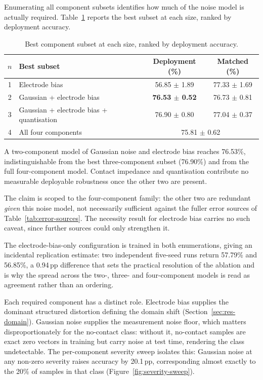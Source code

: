 Enumerating all component subsets identifies how much of the noise model is actually required. Table~\ref{tab:ablation-subset} reports the best subset at each size, ranked by deployment accuracy.

\begin{table}[htbp]
\centering
\caption[Best component subset at each size]{Best component subset at each size, ranked by deployment accuracy.}
\label{tab:ablation-subset}
\small
\setlength{\tabcolsep}{8pt}
\renewcommand{\arraystretch}{1.15}
\begin{tabular}{@{}clcc@{}}
\toprule
\textbf{$n$} & \textbf{Best subset} & \textbf{Deployment (\%)} & \textbf{Matched (\%)} \\
\midrule
1 & Electrode bias                                & 56.85 $\pm$ 1.89 & 77.33 $\pm$ 1.69 \\
2 & Gaussian + electrode bias                     & \textbf{76.53 $\pm$ 0.52} & 76.73 $\pm$ 0.81 \\
3 & Gaussian + electrode bias + quantisation      & 76.90 $\pm$ 0.80 & 77.04 $\pm$ 0.37 \\
4 & All four components                           & \multicolumn{2}{c}{75.81 $\pm$ 0.62} \\
\bottomrule
\end{tabular}
\end{table}

A two-component model of Gaussian noise and electrode bias reaches 76.53\%, indistinguishable from the best three-component subset (76.90\%) and from the full four-component model. Contact impedance and quantisation contribute no measurable deployable robustness once the other two are present.

The claim is scoped to the four-component family: the other two are redundant \emph{given} this noise model, not necessarily sufficient against the fuller error sources of Table~\ref{tab:error-sources}. The necessity result for electrode bias carries no such caveat, since further sources could only strengthen it.

The electrode-bias-only configuration is trained in both enumerations, giving an incidental replication estimate: two independent five-seed runs return 57.79\% and 56.85\%, a 0.94\,pp difference that sets the practical resolution of the ablation and is why the spread across the two-, three- and four-component models is read as agreement rather than an ordering.

Each required component has a distinct role. Electrode bias supplies the dominant structured distortion defining the domain shift (Section~\ref{sec:res-domain}). Gaussian noise supplies the measurement noise floor, which matters disproportionately for the no-contact class: without it, no-contact samples are exact zero vectors in training but carry noise at test time, rendering the class undetectable. The per-component severity sweep isolates this: Gaussian noise at any non-zero severity raises accuracy by 20.1\,pp, corresponding almost exactly to the 20\% of samples in that class (Figure~\ref{fig:severity-sweep}).

